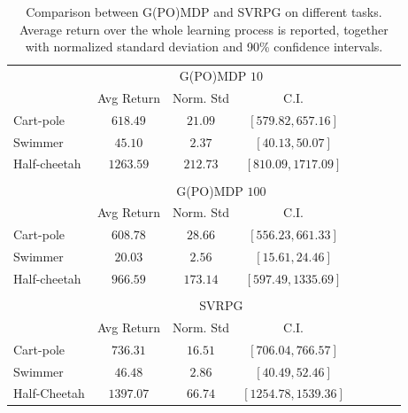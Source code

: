 \begin{table}[h]
	\caption{
		\label{tab:1}
		Comparison between G(PO)MDP and \acs{SVRPG} on different tasks. Average return over the whole learning process is reported, together with normalized standard deviation and 90\% confidence intervals.}
	\centering
	\begin{tabular}{@{}lccccccc@{}} 
		\toprule
		\phantom{abc} & \multicolumn{3}{c}{G(PO)MDP $10$} \\
		\cmidrule{2-4}
		\phantom{abc} & Avg Return & Norm. Std & C.I.
		\\\cmidrule{2-4}
		Cart-pole & $618.49$ & $21.09$ & $[579.82, 657.16]$\\
		Swimmer & $45.10$ & $2.37$ & $[40.13, 50.07]$\\
		Half-cheetah & $1263.59$ & $212.73$ & $[810.09, 1717.09]$\\
		\\\cmidrule{2-4}
		\phantom{abc} & \multicolumn{3}{c}{G(PO)MDP $100$} \\
		\cmidrule{2-4}
		\phantom{abc} & Avg Return & Norm. Std & C.I.
		\\\cmidrule{2-4}
		Cart-pole & $608.78$ & $28.66$ & $[556.23, 661.33]$\\
		Swimmer & $20.03$ & $2.56$ & $[15.61, 24.46]$\\
		Half-cheetah & $966.59$ & $173.14$ & $[597.49, 1335.69]$\\
		\\\cmidrule{2-4}
		\phantom{abc} & \multicolumn{3}{c}{SVRPG}
		\\\cmidrule{2-4}
		\phantom{abc} & Avg Return & Norm. Std & C.I.
		\\\cmidrule{2-4}
		Cart-pole & $736.31$ & $16.51$ & $[706.04, 766.57]$\\
		Swimmer & $46.48$ & $2.86$ & $[40.49, 52.46]$\\
		Half-Cheetah & $1397.07$ & $66.74$ & $[1254.78, 1539.36]$\\
		\bottomrule
	\end{tabular}
	\vspace{-0.05in}
\end{table}

